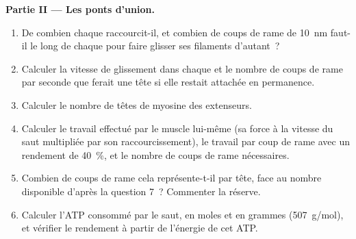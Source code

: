 \begin{problem}
\medskip
\noindent\textbf{Partie II --- Les ponts d'union.}
\begin{enumerate}[resume]
  \item De combien chaque  raccourcit-il, et combien de coups de
        rame de \qty{10}{nm} faut-il le long de chaque 
        pour faire glisser ses filaments d'autant~?
  \item Calculer la vitesse de glissement dans chaque  et
        le nombre de coups de rame par seconde que ferait une tête si
        elle restait attachée en permanence.
  \item Calculer le nombre de têtes de myosine des extenseurs.
  \item Calculer le travail effectué par le muscle lui-même (sa force à
        la vitesse du saut multipliée par son raccourcissement), le
        travail par coup de rame avec un rendement de \qty{40}{\%}, et le
        nombre de coups de rame nécessaires.
  \item Combien de coups de rame cela représente-t-il par tête, face au
        nombre disponible d'après la question 7~? Commenter la réserve.
  \item Calculer l'ATP consommé par le saut, en moles et en grammes
        (\qty{507}{g/mol}), et vérifier le rendement à partir de
        l'énergie de cet ATP.
\end{enumerate}


\end{problem}
